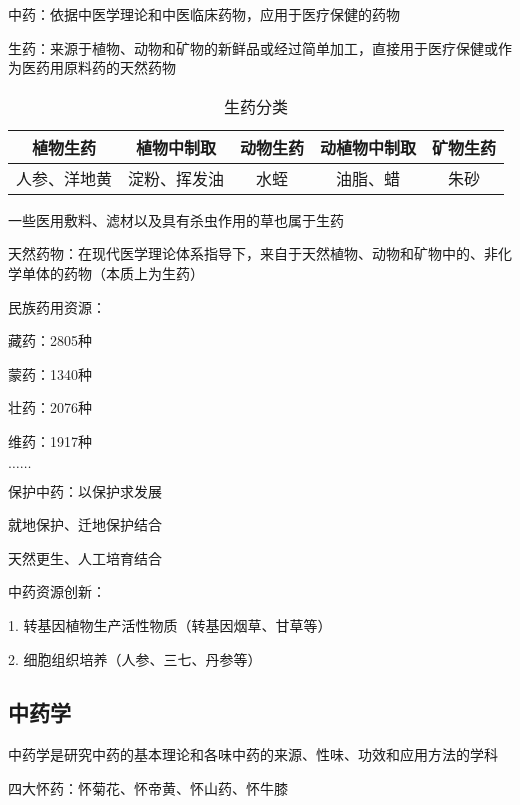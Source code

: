 \begin{defi}
    中药：依据中医学理论和中医临床药物，应用于医疗保健的药物
\end{defi}
\begin{defi}
    生药：来源于植物、动物和矿物的新鲜品或经过简单加工，直接用于医疗保健或作为医药用原料药的天然药物
\end{defi}
\begin{table}[htpb]
    \centering
    \caption{生药分类}
    \label{tab:生药分类}
    \begin{tabular}{ccccc}
    \toprule
    植物生药 & 植物中制取 & 动物生药 & 动植物中制取 & 矿物生药\\
    \midrule
    人参、洋地黄 & 淀粉、挥发油 & 水蛭 & 油脂、蜡 &朱砂 \\
    \bottomrule
    \end{tabular}
\end{table}
\begin{notation}
    一些医用敷料、滤材以及具有杀虫作用的草也属于生药
\end{notation}
\begin{defi}
    天然药物：在现代医学理论体系指导下，来自于天然植物、动物和矿物中的、非化学单体的药物（本质上为生药）
\end{defi}
民族药用资源：

藏药：2805种

蒙药：1340种

壮药：2076种

维药：1917种

$\ldots\ldots$
\begin{notation}
    保护中药：以保护求发展

    就地保护、迁地保护结合

    天然更生、人工培育结合
\end{notation}
\begin{notation}
    中药资源创新：

    1. 转基因植物生产活性物质（转基因烟草、甘草等）

    2. 细胞组织培养（人参、三七、丹参等）
\end{notation}
\subsection{中药学}%
\label{sub:中药学}
\begin{defi}
    中药学是研究中药的基本理论和各味中药的来源、性味、功效和应用方法的学科
\end{defi}
\begin{notation}
    四大怀药：怀菊花、怀帝黄、怀山药、怀牛膝
\end{notation}

















